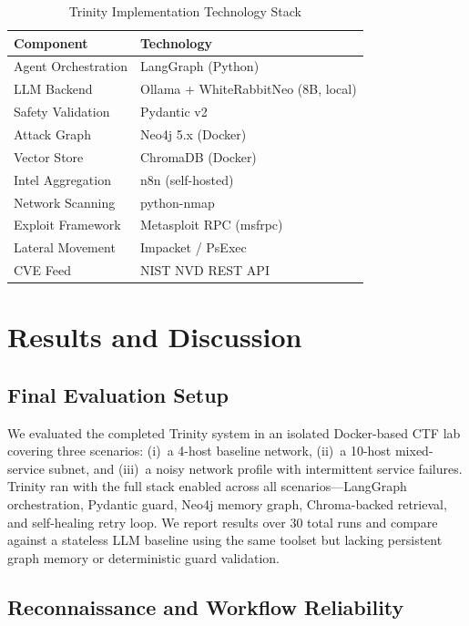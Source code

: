 \documentclass[conference]{IEEEtran}
\begin{document}
\begin{table}[h]
\centering
\caption{Trinity Implementation Technology Stack}
\label{tab:stack}
\begin{tabular}{ll}
\toprule
\textbf{Component} & \textbf{Technology} \\
\midrule
Agent Orchestration & LangGraph (Python) \\
LLM Backend & Ollama + WhiteRabbitNeo (8B, local) \\
Safety Validation & Pydantic v2 \\
Attack Graph & Neo4j 5.x (Docker) \\
Vector Store & ChromaDB (Docker) \\
Intel Aggregation & n8n (self-hosted) \\
Network Scanning & python-nmap \\
Exploit Framework & Metasploit RPC (msfrpc) \\
Lateral Movement & Impacket / PsExec \\
CVE Feed & NIST NVD REST API \\
\bottomrule
\end{tabular}
\end{table}

\section{Results and Discussion}
\label{sec:results}

\subsection{Final Evaluation Setup}

We evaluated the completed Trinity system in an isolated Docker-based CTF lab covering three scenarios: (i)~a 4-host baseline network, (ii)~a 10-host mixed-service subnet, and (iii)~a noisy network profile with intermittent service failures. Trinity ran with the full stack enabled across all scenarios---LangGraph orchestration, Pydantic guard, Neo4j memory graph, Chroma-backed retrieval, and self-healing retry loop. We report results over 30 total runs and compare against a stateless LLM baseline using the same toolset but lacking persistent graph memory or deterministic guard validation.

\subsection{Reconnaissance and Workflow Reliability}
\end{document}
